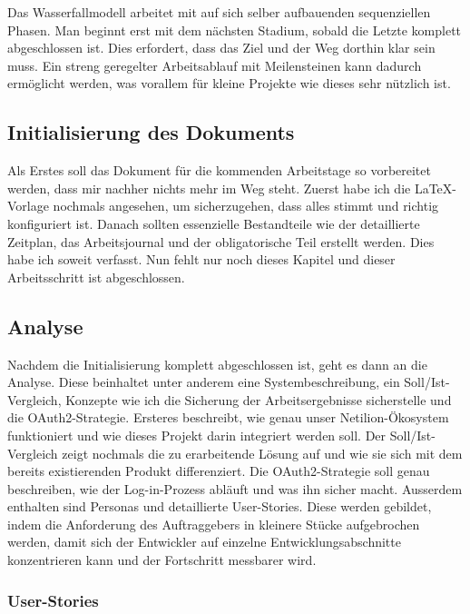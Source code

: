 Das Wasserfallmodell arbeitet mit auf sich selber aufbauenden sequenziellen Phasen. Man beginnt erst
mit dem nächsten Stadium, sobald die Letzte komplett abgeschlossen ist. Dies erfordert, dass das Ziel und
der Weg dorthin klar sein muss. Ein streng geregelter Arbeitsablauf mit Meilensteinen kann dadurch
ermöglicht werden, was vorallem für kleine Projekte wie dieses sehr nützlich ist.

\subsection{Initialisierung des Dokuments}

Als Erstes soll das Dokument für die kommenden Arbeitstage so vorbereitet werden, dass mir nachher nichts mehr im Weg steht. Zuerst habe ich die LaTeX-Vorlage nochmals angesehen, um sicherzugehen, dass alles stimmt und richtig konfiguriert ist. Danach sollten essenzielle Bestandteile wie der detaillierte Zeitplan, das Arbeitsjournal und der obligatorische Teil erstellt werden. Dies habe ich soweit verfasst. Nun fehlt nur noch dieses Kapitel und dieser Arbeitsschritt ist abgeschlossen.

\subsection{Analyse}

Nachdem die Initialisierung komplett abgeschlossen ist, geht es dann an die Analyse. Diese beinhaltet unter anderem eine Systembeschreibung, ein Soll/Ist-Vergleich, Konzepte wie ich die Sicherung der Arbeitsergebnisse sicherstelle und die OAuth2-Strategie. Ersteres beschreibt, wie genau unser Netilion-Ökosystem funktioniert und wie dieses Projekt darin integriert werden soll. Der Soll/Ist-Vergleich zeigt nochmals die zu erarbeitende Lösung auf und wie sie sich mit dem bereits existierenden Produkt differenziert. Die OAuth2-Strategie soll genau beschreiben, wie der Log-in-Prozess abläuft und was ihn sicher macht.
\newline
Ausserdem enthalten sind Personas und detaillierte User-Stories. Diese werden gebildet, indem die Anforderung des Auftraggebers in kleinere Stücke aufgebrochen werden, damit sich der Entwickler auf einzelne Entwicklungsabschnitte konzentrieren kann und der Fortschritt messbarer wird.

\subsubsection{User-Stories}

